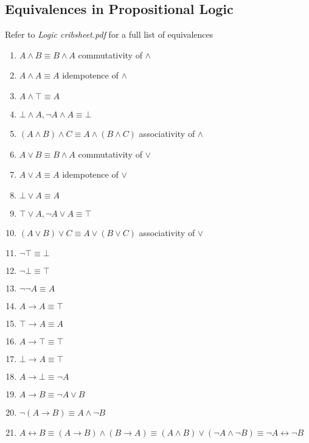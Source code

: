 \documentclass[a4paper, 12pt]{article}
\begin{document}
        \subsection*{Equivalences in Propositional Logic}
            Refer to \textit{Logic cribsheet.pdf} for a full list of equivalences
            \begin{enumerate}[1.]
                \itemsep0em
                \item $A \land B \equiv B \land A$ \hfill commutativity of $\land$
                \item $A \land A \equiv A$ \hfill idempotence of $\land$
                \item $A \land \top \equiv A$
                \item $\bot \land A, \neg A \land A \equiv \bot$
                \item $(A \land B) \land C \equiv A \land (B \land C)$ \hfill associativity of $\land$
                \item $A \lor B \equiv B \land A$ \hfill commutativity of $\lor$
                \item $A \lor A \equiv A$ \hfill idempotence of $\lor$
                \item $\bot \lor A \equiv A$
                \item $\top \lor A, \neg A \lor A \equiv \top$
                \item $(A \lor B) \lor C \equiv A \lor (B \lor C)$ \hfill associativity of $\lor$
                \item $\neg \top \equiv \bot$
                \item $\neg \bot \equiv \top$
                \item $\neg \neg A \equiv A$
                \item $A \rightarrow A \equiv \top$
                \item $\top \rightarrow A \equiv A$
                \item $A \rightarrow \top \equiv \top$
                \item $\bot \rightarrow A \equiv \top$
                \item $A \rightarrow \bot \equiv \neg A$
                \item $A \rightarrow B \equiv \neg A \lor B$
                \item $\neg (A \rightarrow B) \equiv A \land \neg B$
                \item $A \leftrightarrow B \equiv (A \rightarrow B) \land (B \rightarrow A) \equiv (A \land B) \lor (\neg A \land \neg B) \equiv \neg A \leftrightarrow \neg B$

\end{enumerate}
\end{document}

